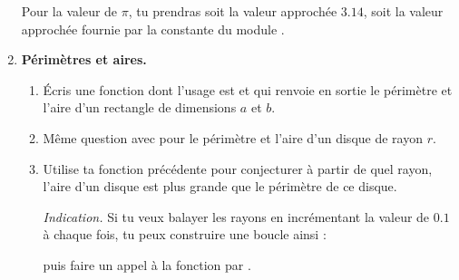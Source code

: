 \documentclass[11pt,class=report,crop=false]{standalone}
\begin{document}
\begin{activite}
\begin{enumerate}
   Pour la valeur de $\pi$, tu prendras soit la valeur approchée $3.14$, soit la valeur approchée fournie par la constante  du module .
  
  
  \item \textbf{Périmètres et aires.}
  
  \begin{enumerate}
    \item Écris une fonction dont l'usage est  et qui renvoie en sortie le périmètre et l'aire d'un rectangle de dimensions $a$ et $b$.
   
    
    \item Même question avec  pour le périmètre et l'aire d'un disque de rayon $r$.
    
    \item Utilise ta fonction précédente pour conjecturer à partir de quel rayon, l'aire d'un disque est plus grande que le périmètre de ce disque.
    
    \emph{Indication.} Si tu veux balayer les rayons en incrémentant la valeur de $0.1$ à chaque fois, tu peux construire une boucle ainsi :
    
    \centerline{}
    
    puis faire un appel à la fonction par .
  \end{enumerate}
\end{enumerate}
  

\end{activite}




\end{document}
